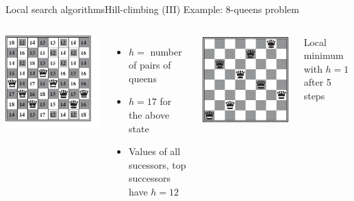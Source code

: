 \documentclass[10pt,compress]{beamer} %
\begin{document}
\begin{frame}{Local search algorithms}{Hill-climbing (III)}
    \centering Example: 8-queens problem

 	\begin{columns}
	    \begin{center}
		\includegraphics[width=0.7\linewidth]{figs/8queens-successors.eps}
	    \end{center}
        
        \vspace{-0.5cm}
        \begin{itemize}
        \item $h =$ number of pairs of queens
        \item $h = 17$ for the above state
        \item Values of all sucessors, top successors have $h = 12$
        \end{itemize}

	    \begin{center}
		\includegraphics[width=0.7\linewidth]{figs/8queens-local-minimum.eps}
	    \end{center}

        Local minimum with $h=1$ after 5 steps
 	\end{columns}

\end{frame}
\end{document}
